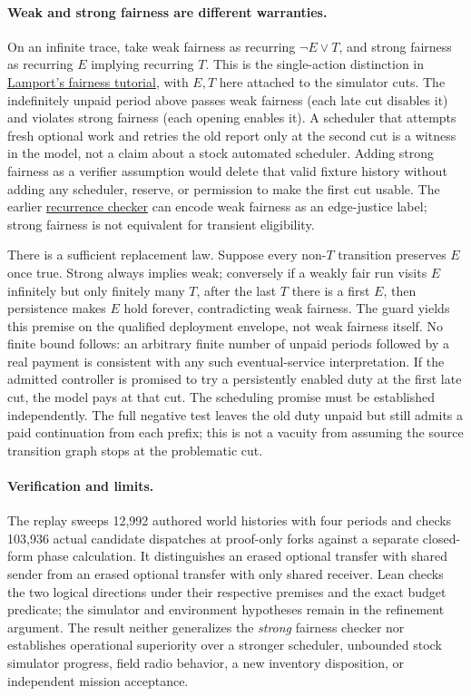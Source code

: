 \documentclass{article}
\begin{document}
\paragraph{Weak and strong fairness are different warranties.}
On an infinite trace, take weak fairness as recurring
\(\neg E\lor T\), and strong fairness as recurring \(E\) implying
recurring \(T\). This is the single-action distinction in
\href{https://lamport.azurewebsites.net/tla/tutorial/session11-2.html}{Lamport's
fairness tutorial}, with \(E,T\) here attached to the simulator cuts.
The indefinitely unpaid period above passes weak fairness (each late
cut disables it) and violates strong fairness (each opening enables
it). A scheduler that attempts fresh optional work and retries the
old report only at the second cut is a witness in the model, not a
claim about a stock automated scheduler. Adding strong fairness as
a verifier assumption would delete that valid fixture history without
adding any scheduler, reserve, or permission to make the first cut
usable. The earlier
\href{https://github.com/eternal-november/eos-research-programmes/pull/617}{recurrence
checker} can encode weak fairness as an edge-justice label; strong
fairness is not equivalent for transient eligibility.

There is a sufficient replacement law. Suppose every non-\(T\)
transition preserves \(E\) once true. Strong always implies weak;
conversely if a weakly fair run visits \(E\) infinitely but only
finitely many \(T\), after the last \(T\) there is a first \(E\),
then persistence makes \(E\) hold forever, contradicting weak
fairness. The guard yields this premise on the qualified deployment
envelope, not weak fairness itself. No finite bound follows:
an arbitrary finite number of unpaid periods followed by a real
payment is consistent with any such eventual-service interpretation.
If the admitted controller is promised to try a persistently
enabled duty at the first late cut, the model pays at that cut.
The scheduling promise must be established independently.
The full negative test leaves the old duty unpaid but still admits a
paid continuation from each prefix; this is not a vacuity from
assuming the source transition graph stops at the problematic cut.

\paragraph{Verification and limits.}
The replay sweeps 12,992 authored world histories with four periods
and checks 103,936 actual candidate dispatches at proof-only forks
against a separate closed-form phase calculation. It distinguishes an
erased optional transfer with shared sender from an erased optional
transfer with only shared receiver. Lean checks the two logical
directions under their respective premises and the exact budget
predicate; the simulator and environment hypotheses remain in the
refinement argument. The result neither generalizes the \emph{strong}
fairness checker nor establishes operational superiority over a
stronger scheduler, unbounded stock simulator progress, field radio
behavior, a new inventory disposition, or independent mission acceptance.
\end{document}
